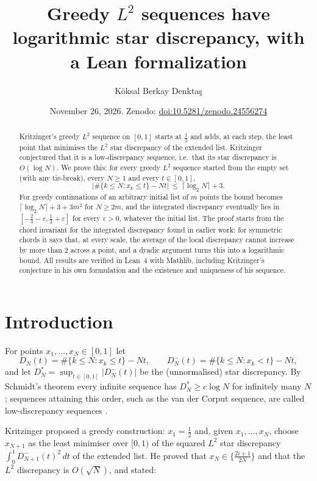 \documentclass[11pt]{amsart}
\title[K.~B.~Denkta\c{s} \,---\, Greedy $L^2$ sequences have logarithmic star discrepancy]{Greedy $L^2$ sequences have logarithmic star discrepancy, with a Lean formalization}
\author{K\"oksal Berkay Denkta\c{s}}
\date{November 26, 2026. Zenodo: \href{https://doi.org/10.5281/zenodo.24556274}{doi:10.5281/zenodo.24556274}}
\theoremstyle{remark}
\begin{document}
\begin{abstract}
Kritzinger's greedy $L^2$ sequence on $[0,1]$ starts at $\frac12$ and adds, at
each step, the least point that minimises the $L^2$ star discrepancy of the
extended list. Kritzinger conjectured that it is a low-discrepancy sequence,
i.e.\ that its star discrepancy is $O(\log N)$. We prove this: for every greedy
$L^2$ sequence started from the empty set (with any tie-break), every $N\ge1$
and every $t\in[0,1]$,
\[
\bigl|\#\{k\le N:x_k\le t\}-Nt\bigr|\ \le\ \lceil\log_2N\rceil+3 .
\]
For greedy continuations of an arbitrary initial list of $m$ points the bound
becomes $\lceil\log_2N\rceil+3+3m^2$ for $N\ge2m$, and the integrated
discrepancy eventually lies in $[-\frac23-\varepsilon,\frac12+\varepsilon]$ for
every $\varepsilon>0$, whatever the initial list. The proof starts from the chord
invariant for the integrated discrepancy found in earlier work: for
symmetric chords it says that, at every scale, the average of the local
discrepancy cannot increase by more than $2$ across a point, and a dyadic
argument turns this into a logarithmic bound. All results are verified in Lean~4
with Mathlib, including Kritzinger's conjecture in his own formulation and the
existence and uniqueness of his sequence.
\end{abstract}

\maketitle

\section{Introduction}

For points $x_1,\dots,x_N\in[0,1]$ let
\[
D_N(t)=\#\{k\le N:x_k\le t\}-Nt,\qquad D_N^-(t)=\#\{k\le N:x_k<t\}-Nt ,
\]
and let $D_N^*=\sup_{t\in[0,1]}|D_N^-(t)|$ be the (unnormalised) star
discrepancy. By Schmidt's theorem \cite{Sch} every infinite sequence has
$D_N^*\ge c\log N$ for infinitely many $N$; sequences attaining this order, such
as the van der Corput sequence, are called low-discrepancy sequences
\cite{Kri}.

Kritzinger \cite{Kri} proposed a greedy construction: $x_1=\frac12$ and, given
$x_1,\dots,x_N$, choose $x_{N+1}$ as the least minimiser over $[0,1)$ of the
squared $L^2$ star discrepancy $\int_0^1D_{N+1}^-(t)^2\,dt$ of the extended list. He
proved that $x_N\in\{\frac{2i+1}{2N}\}$ and that the $L^2$ discrepancy is
$O(\sqrt N)$, and stated:
\end{document}
